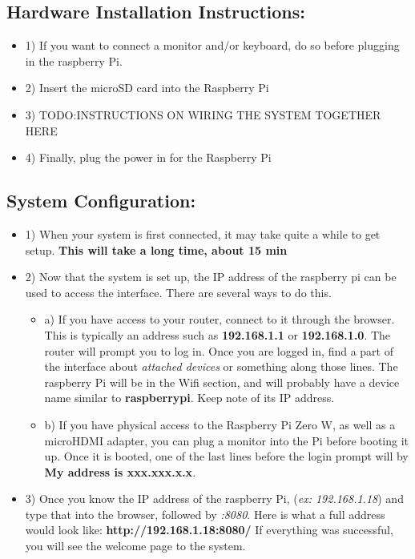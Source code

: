\documentclass[onecolumn, draftclsnofoot,10pt, compsoc]{IEEEtran}
\begin{document}
	\subsection{\textbf{Hardware Installation Instructions:}}
	\begin{itemize}
		\item 1) If you want to connect a monitor and/or keyboard, do so before plugging in the raspberry Pi.
		\item 2) Insert the microSD card into the Raspberry Pi
		\item 3) TODO:INSTRUCTIONS ON WIRING THE SYSTEM TOGETHER HERE
		\item 4) Finally, plug the power in for the Raspberry Pi
	\end{itemize}


	\subsection{\textbf{System Configuration:}}
	\begin{itemize}
		\item 1) When your system is first connected, it may take quite a while to get setup. \textbf{This will take a long time, about 15 min}
		\item 2) Now that the system is set up, the IP address of the raspberry pi can be used to access the interface. There are several ways to do this.
		\begin{itemize}
			\item a) If you have access to your router, connect to it through the browser. This is typically an address such as \textbf{192.168.1.1} or \textbf{192.168.1.0}. The router will prompt you to log in. Once you are logged in, find a part of the interface about \textit{attached devices} or something along those lines. The raspberry Pi will be in the Wifi section, and will probably have a device name similar to \textbf{raspberrypi}. Keep note of its IP address.
			\item b) If you have physical access to the Raspberry Pi Zero W, as well as a microHDMI adapter, you can plug a monitor into the Pi before booting it up. Once it is booted, one of the last lines before the login prompt will by \textbf{My address is xxx.xxx.x.x}.
		\end{itemize}
		\item 3) Once you know the IP address of the raspberry Pi, (\textit{ex: 192.168.1.18}) and type that into the browser, followed by \textit{:8080}. Here is what a full address would look like: \textbf{http://192.168.1.18:8080/} If everything was successful, you will see the welcome page to the system.
	\end{itemize}
	
\end{document}
